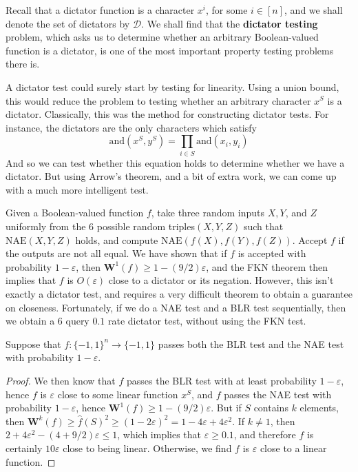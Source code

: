 Recall that a dictator function is a character $x^i$, for some $i \in [n]$, and we shall denote the set of dictators by $\mathcal{D}$. We shall find that the {\bf dictator testing} problem, which asks us to determine whether an arbitrary Boolean-valued function is a dictator, is one of the most important property testing problems there is.

A dictator test could surely start by testing for linearity. Using a union bound, this would reduce the problem to testing whether an arbitrary character $x^S$ is a dictator. Classically, this was the method for constructing dictator tests. For instance, the dictators are the only characters which satisfy
%
\[ \text{and}(x^S, y^S) = \prod_{i \in S} \text{and}(x_i,y_i) \]
%
And so we can test whether this equation holds to determine whether we have a dictator. But using Arrow's theorem, and a bit of extra work, we can come up with a much more intelligent test.

Given a Boolean-valued function $f$, take three random inputs $X,Y$, and $Z$ uniformly from the 6 possible random triples$(X,Y,Z)$ such that $\text{NAE}(X,Y,Z)$ holds, and compute $\text{NAE}(f(X),f(Y),f(Z))$. Accept $f$ if the outputs are not all equal. We have shown that if $f$ is accepted with probability $1 - \varepsilon$, then $\mathbf{W}^1(f) \geq 1 - (9/2) \varepsilon$, and the FKN theorem then implies that $f$ is $O(\varepsilon)$ close to a dictator or its negation. However, this isn't exactly a dictator test, and requires a very difficult theorem to obtain a guarantee on closeness. Fortunately, if we do a NAE test and a BLR test sequentially, then we obtain a 6 query $0.1$ rate dictator test, without using the FKN test.

\begin{theorem}
    Suppose that $f: \{ -1, 1 \}^n \to \{ -1, 1 \}$ passes both the BLR test and the NAE test with probability $1 - \varepsilon$.
\end{theorem}
\begin{proof}
    We then know that $f$ passes the BLR test with at least probability $1 - \varepsilon$, hence $f$ is $\varepsilon$ close to some linear function $x^S$, and $f$ passes the NAE test with probability $1 - \varepsilon$, hence $\mathbf{W}^1(f) \geq 1 - (9/2) \varepsilon$. But if $S$ contains $k$ elements, then $\mathbf{W}^k(f) \geq \widehat{f}(S)^2 \geq (1 - 2\varepsilon)^2 = 1 - 4\varepsilon + 4\varepsilon^2$. If $k \neq 1$, then $2 + 4 \varepsilon^2 - (4 + 9/2) \varepsilon \leq 1$, which implies that $\varepsilon \geq 0.1$, and therefore $f$ is certainly $10 \varepsilon$ close to being linear. Otherwise, we find $f$ is $\varepsilon$ close to a linear function.
\end{proof}


